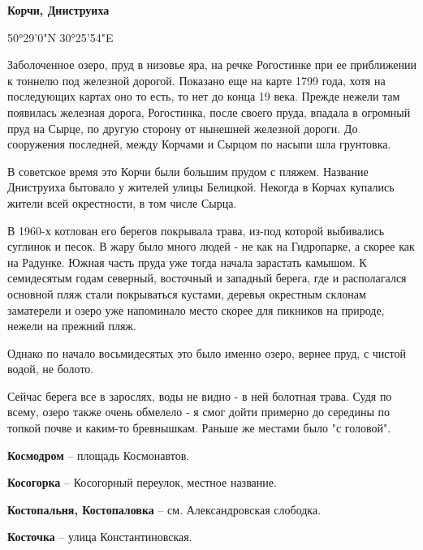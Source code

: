 \medskip

\textbf{Корчи, Дниструиха}

50°29'0"N 30°25'54"E

Заболоченное озеро, пруд в низовье яра, на речке Рогостинке при ее приближении к тоннелю под железной дорогой. Показано еще на карте 1799 года, хотя на последующих картах оно то есть, то нет до конца 19 века. Прежде нежели там появилась железная дорога, Рогостинка, после своего пруда, впадала в огромный пруд на Сырце, по другую сторону от нынешней железной дороги. До сооружения последней, между Корчами и Сырцом по насыпи шла грунтовка.

В советское время это Корчи были большим прудом с пляжем. Название Дниструиха бытовало у жителей улицы Белицкой. Некогда в Корчах купались жители всей окрестности, в том числе Сырца.

В 1960-х котлован его берегов покрывала трава, из-под которой выбивались суглинок и песок. В жару было много людей - не как на Гидропарке, а скорее как на Радунке. Южная часть пруда уже тогда начала зарастать камышом. К семидесятым годам северный, восточный и западный берега, где и располагался основной пляж стали покрываться кустами, деревья окрестным склонам заматерели и озеро уже напоминало место скорее для пикников на природе, нежели на прежний пляж.

Однако по начало восьмидесятых это было именно озеро, вернее пруд, с чистой водой, не болото.

Сейчас берега все в зарослях, воды не видно - в ней болотная трава. Судя по всему, озеро также очень обмелело - я смог дойти примерно до середины по топкой почве и каким-то бревнышкам. Раньше же местами было "с головой".\\

\medskip

\textbf{Космодром} – площадь Космонавтов.\\

\medskip

\textbf{Косогорка} – Косогорный переулок, местное название.\\

\medskip

\textbf{Костопальня, Костопаловка} – см.  Александровская слободка.\\

\medskip

\textbf{Косточка} – улица Константиновская.\\

\medskip

